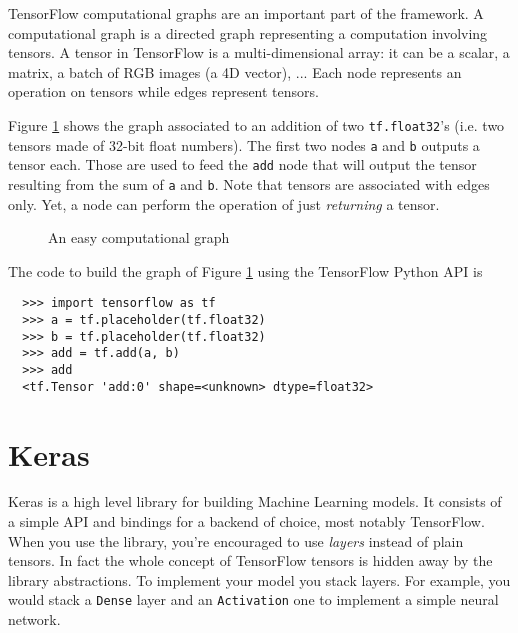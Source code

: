 TensorFlow computational graphs are an important part of the framework.
A computational graph is a directed graph representing a computation
involving tensors. A tensor in TensorFlow is a multi-dimensional array:
it can be a scalar, a matrix, a batch of RGB images (a 4D vector), ...
Each node represents an operation on tensors while edges represent
tensors.

Figure \ref{fig:easygraph} shows the graph associated to an addition of
two \texttt{tf.float32}'s (i.e. two tensors made of 32-bit float
numbers). The first two nodes \texttt{a} and \texttt{b} outputs a
tensor each. Those are used to feed the \texttt{add} node that will
output the tensor resulting from the sum of \texttt{a} and \texttt{b}.
Note that tensors are associated with edges only. Yet, a node can
perform the operation of just \emph{returning} a tensor.

\begin{figure}[H]
  \centering
  \caption[easygraph]{An easy computational graph}
  \label{fig:easygraph}
\end{figure}

The code to build the graph of Figure \ref{fig:easygraph} using the
TensorFlow Python API is

\begin{verbatim}
  >>> import tensorflow as tf
  >>> a = tf.placeholder(tf.float32)
  >>> b = tf.placeholder(tf.float32)
  >>> add = tf.add(a, b)
  >>> add
  <tf.Tensor 'add:0' shape=<unknown> dtype=float32>
\end{verbatim}

\section{Keras}
\label{sec:keras}

Keras is a high level library for building Machine Learning models. It consists
of a simple API and bindings for a backend of choice, most notably TensorFlow.
When you use the library, you're encouraged to use \emph{layers} instead of
plain tensors. In fact the whole concept of TensorFlow tensors is hidden away by
the library abstractions. To implement your model you stack layers. For example,
you would stack a \texttt{Dense} layer and an \texttt{Activation} one to
implement a simple neural network.

